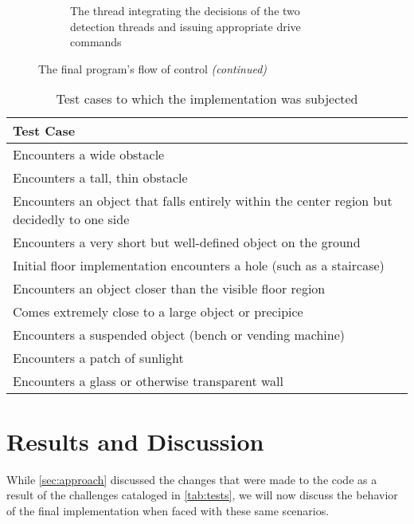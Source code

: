 \documentclass[12pt]{report}
\begin{document}
\begin{figure}
\begin{subfigure}{\textwidth}
\caption{The thread integrating the decisions of the two detection threads and issuing appropriate drive commands}
\label{fig:pilot}
\end{subfigure}
\captionsetup{list=false}
\caption{The final program's flow of control \textit{(continued)}}
\label{fig:runtimecont}
\end{figure}

\begin{table}
\caption{Test cases to which the implementation was subjected}
\label{tab:tests}
\begin{tabular}{| p{\textwidth} |}
\hline
\textbf{Test Case} \\
\hline\hline
Encounters a wide obstacle \\
\hline
Encounters a tall, thin obstacle \\
\hline
Encounters an object that falls entirely within the center region but decidedly to one side \\
\hline
Encounters a very short but well-defined object on the ground \\
\hline
Initial floor implementation encounters a hole (such as a staircase) \\
\hline
Encounters an object closer than the visible floor region \\
\hline
Comes extremely close to a large object or precipice \\
\hline
Encounters a suspended object (bench or vending machine) \\
\hline
Encounters a patch of sunlight \\
\hline
Encounters a glass or otherwise transparent wall \\
\hline
\end{tabular}
\end{table}

\section{Results and Discussion}
While \autoref{sec:approach} discussed the changes that were made to the code as a result of the challenges cataloged in \autoref{tab:tests}, we will now discuss the behavior of the final implementation when faced with these same scenarios.
\end{document}
